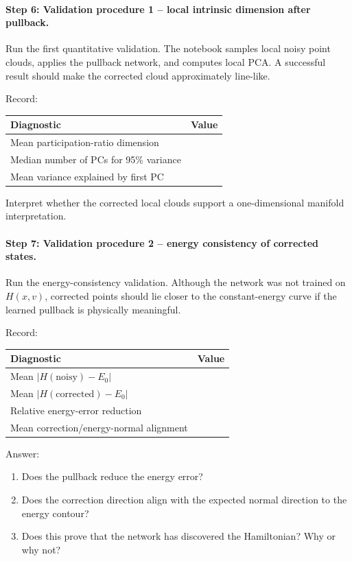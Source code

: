 \paragraph{Step 6: Validation procedure 1 -- local intrinsic dimension after pullback.}
Run the first quantitative validation. The notebook samples local noisy point clouds, applies the pullback network, and computes local PCA. A successful result should make the corrected cloud approximately line-like.

Record:
\begin{center}
\begin{tabular}{l l}
\hline
Diagnostic & Value \\
\hline
Mean participation-ratio dimension & \\
Median number of PCs for 95\% variance & \\
Mean variance explained by first PC & \\
\hline
\end{tabular}
\end{center}

Interpret whether the corrected local clouds support a one-dimensional manifold interpretation.

\paragraph{Step 7: Validation procedure 2 -- energy consistency of corrected states.}
Run the energy-consistency validation. Although the network was not trained on \(H(x,v)\), corrected points should lie closer to the constant-energy curve if the learned pullback is physically meaningful.

Record:
\begin{center}
\begin{tabular}{l l}
\hline
Diagnostic & Value \\
\hline
Mean \(|H(\mathrm{noisy})-E_0|\) & \\
Mean \(|H(\mathrm{corrected})-E_0|\) & \\
Relative energy-error reduction & \\
Mean correction/energy-normal alignment & \\
\hline
\end{tabular}
\end{center}

Answer:
\begin{enumerate}
    \item Does the pullback reduce the energy error?
    \item Does the correction direction align with the expected normal direction to the energy contour?
    \item Does this prove that the network has discovered the Hamiltonian? Why or why not?
\end{enumerate}

